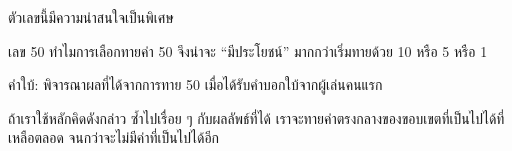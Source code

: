 ตัวเลข{\wbr}นี้{\wbr}มี{\wbr}ความ{\wbr}น่า{\wbr}สนใจ{\wbr}เป็นพิเศษ{\wbr}

\begin{quiz}{เลข 50}
ทำไม{\wbr}การ{\wbr}เลือก{\wbr}ทาย{\wbr}ค่า 50 จึง{\wbr}น่าจะ ``มี{\wbr}ประโยชน์'' มาก{\wbr}กว่า{\wbr}เริ่ม{\wbr}ทาย{\wbr}ด้วย 10 หรือ 5 หรือ 1

คำ{\wbr}ใบ้: พิจารณา{\wbr}ผล{\wbr}ที่{\wbr}ได้{\wbr}จาก{\wbr}การ{\wbr}ทาย 50 เมื่อ{\wbr}ได้{\wbr}รับคำ{\wbr}บอกใบ้{\wbr}จาก{\wbr}ผู้{\wbr}เล่น{\wbr}คน{\wbr}แรก{\wbr}
\end{quiz}

ถ้า{\wbr}เรา{\wbr}ใช้{\wbr}หลัก{\wbr}คิด{\wbr}ดังกล่าว ซ้ำ{\wbr}ไป{\wbr}เรื่อย ๆ กับ{\wbr}ผลลัพธ์{\wbr}ที่{\wbr}ได้{\wbr}
เรา{\wbr}จะ{\wbr}ทาย{\wbr}ค่า{\wbr}ตรง{\wbr}กลาง{\wbr}ของ{\wbr}ขอบเขต{\wbr}ที่{\wbr}เป็น{\wbr}ไป{\wbr}ได้{\wbr}ที่{\wbr}เหลือ{\wbr}ตลอด จนกว่า{\wbr}จะ{\wbr}ไม่{\wbr}มี{\wbr}ค่า{\wbr}ที่{\wbr}เป็น{\wbr}ไป{\wbr}ได้{\wbr}อีก{\wbr}

